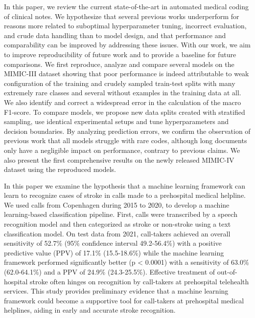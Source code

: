 In this paper, we review the current state-of-the-art in automated medical coding of clinical notes. 
We hypothesize that several previous works underperform for reasons more related to suboptimal hyperparameter tuning, incorrect evaluation, and crude data handling than to model design, and that performance and comparability can be improved by addressing these issues. 
With our work, we aim to improve reproducibility of future work and to provide a baseline for future comparisons. 
We first reproduce, analyze and compare several models on the MIMIC-III dataset showing that poor performance is indeed attributable to weak configuration of the training and crudely sampled train-test splits with many extremely rare classes and several without examples in the training data at all. 
We also identify and correct a widespread error in the calculation of the macro F1-score. 
To compare models, we propose new data splits created with stratified sampling, use identical experimental setups and tune hyperparameters and decision boundaries. 
By analyzing prediction errors, we confirm the observation of previous work that all models struggle with rare codes, although long documents only have a negligible impact on performance, contrary to previous claims. 
We also present the first comprehensive results on the newly released MIMIC-IV dataset using the reproduced models. 

In this paper we examine the hypothesis that a machine learning framework can learn to recognize cases of stroke in calls made to a prehospital medical helpline. 
We used calls from Copenhagen during 2015 to 2020, to develop a machine learning-based classification pipeline. First, calls were transcribed by a speech recognition model and then categorized as stroke or non-stroke using a text classification model.
On test data from 2021, call-takers achieved an overall sensitivity of 52.7\% (95\% confidence interval 49.2-56.4\%) with a positive predictive value (PPV) of 17.1\% (15.5-18.6\%) while the machine learning framework performed significantly better (p < 0.0001) with a sensitivity of 63.0\% (62.0-64.1\%) and a PPV of 24.9\% (24.3-25.5\%).
Effective treatment of out-of-hospital stroke often hinges on recognition by call-takers at prehospital telehealth services. 
This study provides preliminary evidence that a machine learning framework could become a supportive tool for call-takers at prehospital medical helplines, aiding in early and accurate stroke recognition.
